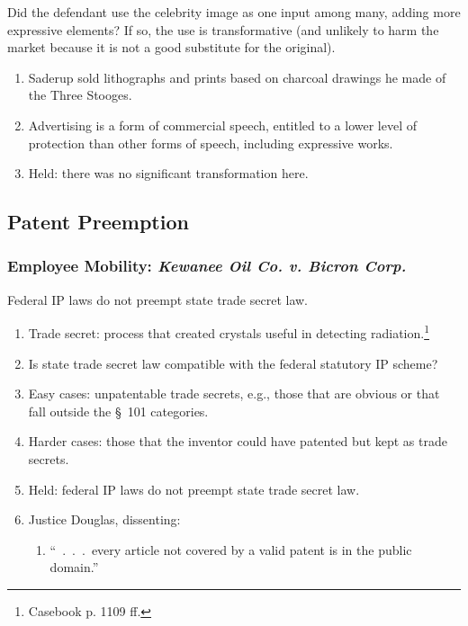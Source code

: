 Did the defendant use the celebrity image as one input among many, adding more 
expressive elements? If so, the use is transformative (and unlikely to harm 
the market because it is not a good substitute for the original).

\begin{enumerate}
    \item Saderup sold lithographs and prints based on charcoal drawings he 
    made of the Three Stooges.
    \item Advertising is a form of commercial speech, entitled to a lower 
    level of protection than other forms of speech, including expressive 
    works.
    \item Held: there was no significant transformation here.
\end{enumerate}

\subsection{Patent Preemption}

\subsubsection{Employee Mobility: \emph{Kewanee Oil Co. v. Bicron Corp.}}

Federal IP laws do not preempt state trade secret law.

\begin{enumerate}
    \item Trade secret: process that created crystals useful in detecting 
    radiation.\footnote{Casebook p. 1109 ff.}
    \item Is state trade secret law compatible with the federal statutory IP 
    scheme?
    \item Easy cases: unpatentable trade secrets, e.g., those that are obvious 
    or that fall outside the \S\ 101 categories.
    \item Harder cases: those that the inventor could have patented but kept 
    as trade secrets. 
    \item Held: federal IP laws do not preempt state trade secret law.
    \item Justice Douglas, dissenting:
    \begin{enumerate}
        \item ``~.~.~.~every article not covered by a valid patent is in the 
        public domain.''
    \end{enumerate}
\end{enumerate}

